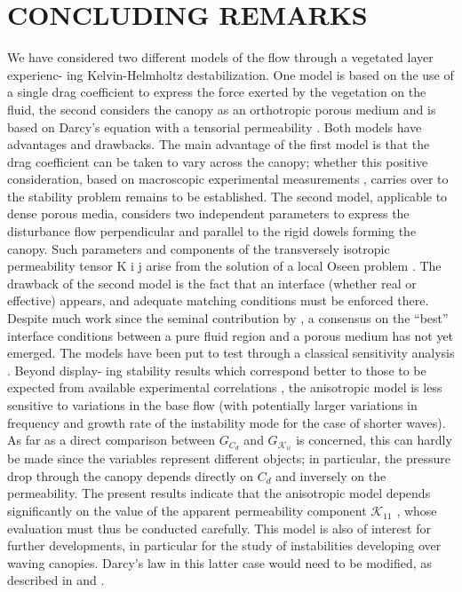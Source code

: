\section{CONCLUDING REMARKS}
We have considered two different models of the flow through a vegetated layer experienc-
ing Kelvin-Helmholtz destabilization. One model is based on the use of a single drag coefficient
to express the force exerted by the vegetation on the fluid, the second considers the canopy as
an orthotropic porous medium and is based on Darcy’s equation with a tensorial permeability \cite{zampogna2016fluid}. 
Both models have advantages and drawbacks. The main advantage of the first model is that the
drag coefficient can be taken to vary across the canopy; whether this positive consideration, based
on macroscopic experimental measurements \cite{ghisalberti2002mixing} \cite{ghisalberti2004limited} \cite{ghisalberti2005mass},  carries over to the stability problem remains to
be established. The second model, applicable to dense porous media, considers two independent
parameters to express the disturbance flow perpendicular and parallel to the rigid dowels forming
the canopy. Such parameters and components of the transversely isotropic permeability tensor K i j
arise from the solution of a local Oseen problem \cite{zampogna2016fluid}. The drawback of the second model is the
fact that an interface (whether real or effective) appears, and adequate matching conditions must
be enforced there. Despite much work since the seminal contribution by \cite{beaver}, a
consensus on the “best” interface conditions between a pure fluid region and a porous medium has
not yet emerged.
The models have been put to test through a classical sensitivity analysis \cite{bottaro2003effect}. Beyond display-
ing stability results which correspond better to those to be expected from available experimental
correlations \cite{raupach1996coherent} \cite{zampogna2016instability}, the anisotropic model is less sensitive to variations in the base flow (with potentially
larger variations in frequency and growth rate of the instability mode for the case of shorter waves).
As far as a direct comparison between $G_{C_d}$ and $G_{\mathcal{K}_{ii}}$ is concerned, this can hardly be made since
the variables represent different objects; in particular, the pressure drop through the canopy depends
directly on $C_d$ and inversely on the permeability. The present results indicate that the anisotropic
model depends significantly on the value of the apparent \cite{zampogna2016fluid} permeability component $\mathcal{K}_{11}$ , whose
evaluation must thus be conducted carefully. This model is also of interest for further developments,
in particular for the study of instabilities developing over waving canopies. Darcy’s law in this latter
case would need to be modified, as described in \cite{mei2010homogenization} and \cite{zampognaMech}.


